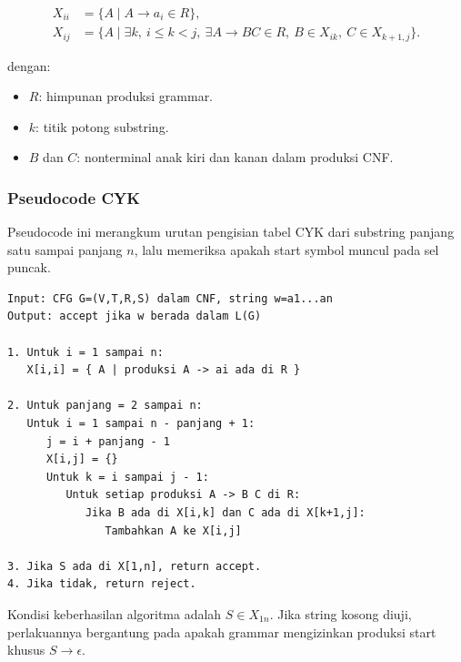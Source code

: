 \begin{align}
    X_{ii} &= \{A\mid A\rightarrow a_i \in R\}, \label{eq:basis-cyk}\\
    X_{ij} &= \{A\mid \exists k,\ i\leq k<j,\ \exists A\rightarrow BC\in R,\ B\in X_{ik},\ C\in X_{k+1,j}\}. \label{eq:induksi-cyk}
\end{align}

dengan:
\begin{itemize}
    \item $R$: himpunan produksi grammar.
    \item $k$: titik potong substring.
    \item $B$ dan $C$: nonterminal anak kiri dan kanan dalam produksi CNF.
\end{itemize}

\subsubsection{Pseudocode CYK}

\begin{jawab}
Pseudocode ini merangkum urutan pengisian tabel CYK dari substring panjang satu sampai panjang $n$, lalu memeriksa apakah start symbol muncul pada sel puncak.
\end{jawab}

\begin{lstlisting}[caption={Pseudocode algoritma CYK}, label={lst:cyk}]
Input: CFG G=(V,T,R,S) dalam CNF, string w=a1...an
Output: accept jika w berada dalam L(G)

1. Untuk i = 1 sampai n:
   X[i,i] = { A | produksi A -> ai ada di R }

2. Untuk panjang = 2 sampai n:
   Untuk i = 1 sampai n - panjang + 1:
      j = i + panjang - 1
      X[i,j] = {}
      Untuk k = i sampai j - 1:
         Untuk setiap produksi A -> B C di R:
            Jika B ada di X[i,k] dan C ada di X[k+1,j]:
               Tambahkan A ke X[i,j]

3. Jika S ada di X[1,n], return accept.
4. Jika tidak, return reject.
\end{lstlisting}

Kondisi keberhasilan algoritma adalah $S\in X_{1n}$. Jika string kosong diuji, perlakuannya bergantung pada apakah grammar mengizinkan produksi start khusus $S\rightarrow\epsilon$.
